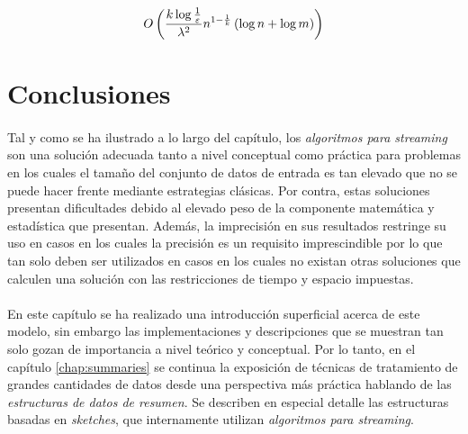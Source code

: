 \documentclass{subfiles}
\begin{document}
      \begin{equation}
      \label{eq:complexity_frecuency_moments}
        {\displaystyle O\left({\dfrac {k\log {1 \over \varepsilon }}{\lambda ^{2}}}n^{1-{1 \over k}}\left(\log n+\log m\right)\right)}
      \end{equation}


  \section{Conclusiones}
  \label{sec:streaming_conclusions}

    \paragraph{}
    Tal y como se ha ilustrado a lo largo del capítulo, los \emph{algoritmos para streaming} son una solución adecuada tanto a nivel conceptual como práctica para problemas en los cuales el tamaño del conjunto de datos de entrada es tan elevado que no se puede hacer frente mediante estrategias clásicas. Por contra, estas soluciones presentan dificultades debido al elevado peso de la componente matemática y estadística que presentan. Además, la imprecisión en sus resultados restringe su uso en casos en los cuales la precisión es un requisito imprescindible por lo que tan solo deben ser utilizados en casos en los cuales no existan otras soluciones que calculen una solución con las restricciones de tiempo y espacio impuestas.

    \paragraph{}
    En este capítulo se ha realizado una introducción superficial acerca de este modelo, sin embargo las implementaciones y descripciones que se muestran tan solo gozan de importancia a nivel teórico y conceptual. Por lo tanto, en el capítulo \ref{chap:summaries} se continua la exposición de técnicas de tratamiento de grandes cantidades de datos desde una perspectiva más práctica hablando de las \emph{estructuras de datos de resumen}. Se describen en especial detalle las estructuras basadas en \emph{sketches}, que internamente utilizan \emph{algoritmos para streaming}.
\end{document}
